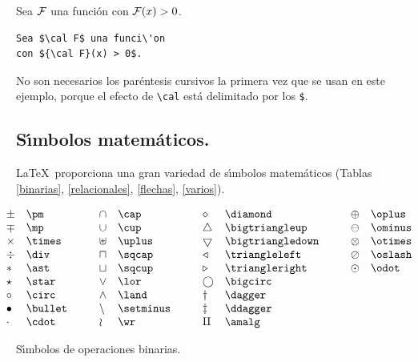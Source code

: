 \vspace{.3cm}
{\small
\begin{minipage}[t]{4cm}
Sea $\cal F$ una funci\'on con ${\cal F}(x) > 0$.
\end{minipage}
\hspace{2cm}
\begin{minipage}[t]{4cm}
\begin{verbatim}
Sea $\cal F$ una funci\'on 
con ${\cal F}(x) > 0$.
\end{verbatim}
\end{minipage}
}
\vspace{.3cm}

No son necesarios los par{\'e}ntesis cursivos la primera vez que se
usan en este ejemplo, porque el efecto de \verb+\cal+ est{\'a}
delimitado por los \verb+$+.

\subsection{S{\'\i}mbolos matem{\'a}ticos.}

\LaTeX\ proporciona una gran variedad de s{\'\i}mbolos matem{\'a}ticos
(Tablas \ref{binarias}, \ref{relacionales}, \ref{flechas}, \ref{varios}).

\begin{table}
$$
\hspace{-.5cm}
\begin{array}{ll@{\hspace{1cm}}ll@{\hspace{1cm}}ll@{\hspace{1cm}}ll}
 \pm & \verb+\pm+ & \cap & \verb+\cap+ & \diamond & \verb+\diamond+
& \oplus & \verb+\oplus+ \\
 \mp & \verb+\mp+ & \cup & \verb+\cup+ & \bigtriangleup &
\verb+\bigtriangleup+ & \ominus & \verb+\ominus+ \\
 \times & \verb+\times+ & \uplus & \verb+\uplus+ & \bigtriangledown
& \verb+\bigtriangledown+ & \otimes & \verb+\otimes+ \\
 \div & \verb+\div+ & \sqcap & \verb+\sqcap+ & \triangleleft &
\verb+\triangleleft+ & \oslash & \verb+\oslash+ \\
 \ast & \verb+\ast+ & \sqcup & \verb+\sqcup+ & \triangleright &
\verb+\triangleright+ & \odot & \verb+\odot+ \\
 \star & \verb+\star+ & \lor & \verb+\lor+  &
\bigcirc & \verb+\bigcirc+ \\
 \circ & \verb+\circ+ & \land & \verb+\land+ & \dagger &
\verb+\dagger+ \\ 
 \bullet & \verb+\bullet+ & \setminus & \verb+\setminus+ & \ddagger &
\verb+\ddagger+ \\ 
 \cdot & \verb+\cdot+ & \wr & \verb+\wr+ & \amalg & \verb+\amalg+ 
\end{array}
$$
\caption{S\'{\i}mbolos de operaciones binarias.}
\label{binarias}
\end{table}

